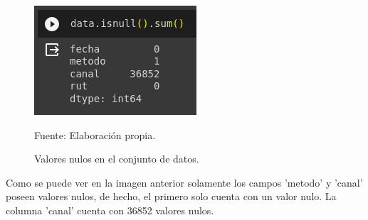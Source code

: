 \begin{figure}[H]
    \begin{minipage}[t]{0.8\textwidth}
        \caption{Valores nulos en el conjunto de datos.}
        \label{valoresNulos}        
    \end{minipage}

    \vspace{10pt}

    \centering
    \begin{minipage}[b]{0.4\textwidth}
        \centering
        \includegraphics[width=\textwidth]{img/valores-nulos.png}        
    \end{minipage}

    \begin{minipage}[t]{0.9\textwidth}
        Fuente: Elaboración propia.
    \end{minipage}
\end{figure}

Como se puede ver en la imagen anterior solamente los campos 'metodo' y 'canal' poseen valores nulos, de hecho, el primero solo cuenta con un valor nulo. La columna 'canal' cuenta con 36852 valores nulos.